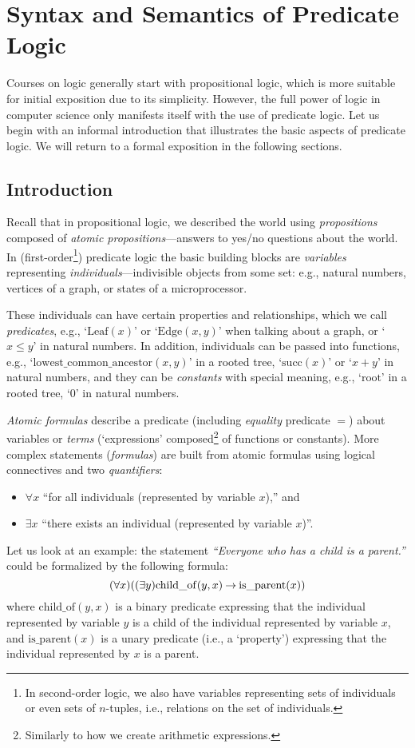 \chapter{Syntax and Semantics of Predicate Logic}

Courses on logic generally start with propositional logic, which is more suitable for initial exposition due to its simplicity. However, the full power of logic in computer science only manifests itself with the use of predicate logic. Let us begin with an informal introduction that illustrates the basic aspects of predicate logic. We will return to a formal exposition in the following sections.

\section{Introduction}
Recall that in propositional logic, we described the world using \emph{propositions} composed of \emph{atomic propositions}---answers to yes/no questions about the world. In (first-order\footnote{In second-order logic, we also have variables representing sets of individuals or even sets of $n$-tuples, i.e., relations on the set of individuals.}) predicate logic  the basic building blocks are \emph{variables} representing \emph{individuals}---indivisible objects from some set: e.g., natural numbers, vertices of a graph, or states of a microprocessor.

These individuals can have certain properties and relationships, which we call \emph{predicates}, e.g., `$\mathrm{Leaf}(x)$' or `$\mathrm{Edge}(x,y)$' when talking about a graph, or `$x\leq y$' in natural numbers. In addition, individuals can be passed into functions, e.g., `$\mathrm{lowest\_common\_ancestor}(x,y)$' in a rooted tree, `$\mathrm{succ}(x)$' or `$x+y$' in natural numbers, and they can be \emph{constants} with special meaning, e.g., `$\mathrm{root}$' in a rooted tree, `$0$' in natural numbers.

\emph{Atomic formulas} describe a predicate (including \emph{equality} predicate $=$) about variables or \emph{terms} (`expressions' composed\footnote{Similarly to how we create arithmetic expressions.} of functions or constants). More complex statements (\emph{formulas}) are built from atomic formulas using logical connectives and two \emph{quantifiers}:
\begin{itemize}
    \item $\forall x$ ``for all individuals (represented by variable $x$),'' and
    \item $\exists x$ ``there exists an individual (represented by variable $x$)''.
\end{itemize}
Let us look at an example: the statement \textit{``Everyone who has a child is a parent.''} could be formalized by the following formula:
$$
(\forall x)((\exists y)\mathrm{child\_of}(y,x)\mathbin{\rightarrow}\mathrm{is\_parent}(x))
$$
where $\mathrm{child\_of}(y,x)$ is a binary predicate expressing that the individual represented by variable $y$ is a child of the individual represented by variable $x$, and $\mathrm{is\_parent}(x)$ is a unary predicate (i.e., a `property') expressing that the individual represented by $x$ is a parent.

